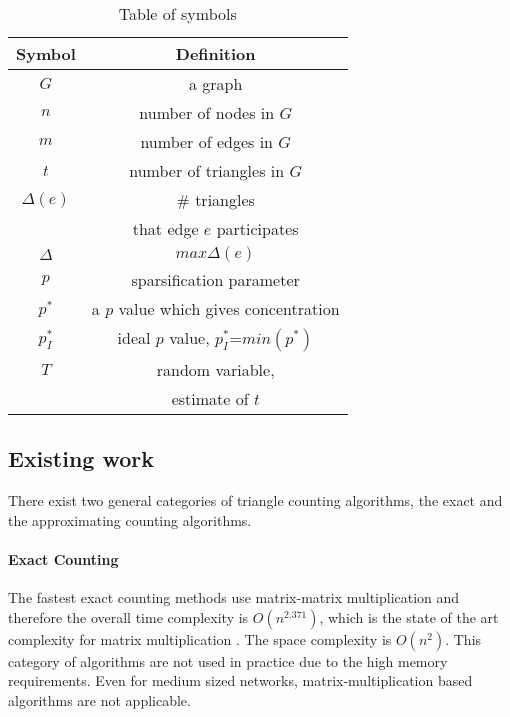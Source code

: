 \documentclass{llncs}
\begin{document}
\begin{table}[t]
	\centering
	\begin{tabular}{|c|c|} \hline \hline
Symbol & Definition \\ \hline \hline
  $G$ & a graph \\ \hline
  $n$ & number of nodes in $G$ \\ \hline
  $m$ & number of edges in $G$ \\ \hline
  $t$ & number of triangles in $G$ \\ \hline
  $\Delta(e)$ & $\#$ triangles  \\ \hline
              & that edge $e$ participates \\ 
	$\Delta$ & $max{\Delta(e)}$ \\ \hline
	$p$  & sparsification parameter \\ \hline
	$p^{*}$ & a $p$ value which gives  
	          concentration \\ \hline
	$p_I^{*}$ & ideal $p$ value, $p_I^{*}$=$min(p^*)$       \\    \hline
	$T$  & random variable, \\
	     & estimate of $t$\\ \hline \hline
\end{tabular}
	\caption{Table of symbols}
\label{tab:Symbols}
\end{table}


\subsection{Existing work}
There exist two general categories of triangle counting algorithms, the exact
and the approximating counting algorithms. 

\paragraph{Exact Counting}
The fastest exact counting methods use matrix-matrix multiplication and therefore
the overall time complexity is $O(n^{2.371})$,  which is the state of the art complexity
for matrix multiplication \cite{CopperWino:CopperWino}. The space complexity is $O(n^2)$. 
This category of algorithms are not used in practice due to the high memory requirements.
Even for medium sized networks, matrix-multiplication based algorithms are not applicable. 
\end{document}
